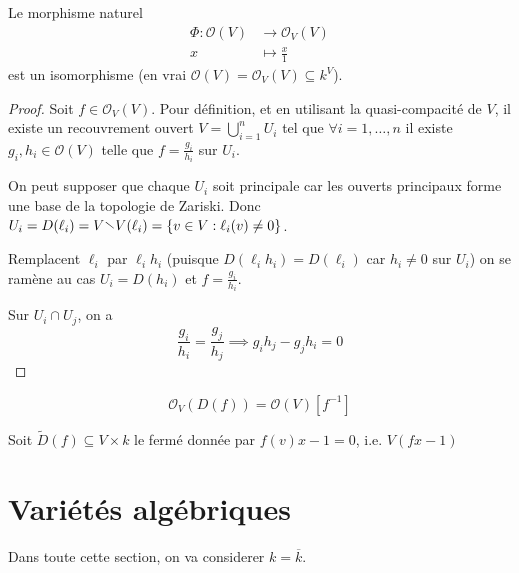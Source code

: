 \begin{proposition}{}
    Le morphisme naturel
    \begin{align*}
        \Phi : \mathcal{O}{(V)}  &\longrightarrow \mathcal{O}_V{(V)} \\
        x &\longmapsto \frac{x}{1}
    \end{align*}
    est un isomorphisme (en vrai \(\mathcal{O}{(V)} = \mathcal{O}_V{(V)}
    \subseteq k^{V} \)).
\end{proposition}
\begin{proof}{}
    Soit \(f \in \mathcal{O}_V{(V)}\). Pour définition, et en utilisant la
    quasi-compacité de \(V\), il existe un recouvrement ouvert \(V =
    \bigcup_{i=1}^{n} U_{i}\) tel que \(\forall i = 1, \dots, n\) il existe
    \(g_{i}, h_{i} \in \mathcal{O}{(V)}\) telle que \(f = \frac{g_{i}}{h_{i}}\)
    sur \(U_{i}\).

    On peut supposer que chaque \(U_{i}\) soit principale car les ouverts
    principaux forme une base de la topologie de Zariski. Donc \(U_{i} =
    D{(\ell_{i})} = V \sminus V{(\ell_{i})} = \{v \in V : \ell_{i}{(v)} \neq
    {0}\} \).

    Remplacent \(\ell_{i}\) par \(\ell_{i}h_{i}\) (puisque \(D{(\ell_{i} h_{i})}
    = D{(\ell_{i})}\) car \(h_{i} \neq 0\) sur \(U_{i}\)) on se ramène au cas
    \(U_{i} = D{(h_{i})}\) et \(f = \frac{g_{i}}{h_{i}}\).

    Sur \(U_{i} \cap U_{j}\), on a
    \[
        \frac{g_{i}}{h_{i}} = \frac{g_{j}}{h_{j}} \implies g_{i}h_{j} -
        g_{j}h_{i} = 0
    \]

\end{proof}

\begin{eser}{}
    \[
        \mathcal{O}_V {(D{(f)})} = \mathcal{O}{(V)}[f^{-1}]
    \]
\end{eser}

Soit \(\tilde{D}{(f)} \subseteq V \times k \) le fermé donnée par \(f{(v)}x - 1
= 0\), i.e. \(V{(fx - 1)}\) 

\section{Variétés algébriques}

Dans toute cette section, on va considerer \(k = \overline{k}\).

